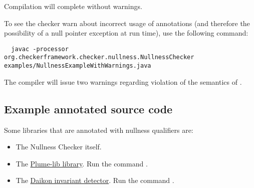 \noindent
Compilation will complete without warnings.

To see the checker warn about incorrect usage of annotations (and therefore the
possibility of a null pointer exception at run time), use the following command:

\begin{mysmall}
\begin{Verbatim}
  javac -processor org.checkerframework.checker.nullness.NullnessChecker examples/NullnessExampleWithWarnings.java
\end{Verbatim}
\end{mysmall}


\noindent
The compiler will issue two warnings regarding violation of the semantics of
.


\subsection{Example annotated source code\label{nullness-annotated-library}}

Some libraries that are annotated with nullness qualifiers are:

\begin{itemize}
\item
The Nullness Checker itself.

\item
The
\href{http://mernst.github.io/plume-lib/}{Plume-lib library}.
Run the command .


\item
The
\href{http://plse.cs.washington.edu/daikon/}{Daikon invariant detector}.
Run the command .

%
%
%

\end{itemize}


